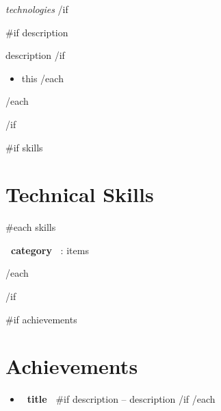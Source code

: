 \documentclass[10pt,a4paper]{article}
\begin{document}
\textit{ {{technologies}} }
{{/if}}


{{#if description}}
\vspace{1pt}

{{description}}
{{/if}}


\begin{itemize}

{{#each bullets}}
    \item {{this}}
{{/each}}

\end{itemize}

\vspace{6pt}

{{/each}}

{{/if}}



{{#if skills}}

\section{Technical Skills}

{{#each skills}}

\textbf{ {{~category~}} }: {{items}}

{{/each}}

{{/if}}



{{#if achievements}}

\section{Achievements}

\begin{itemize}

{{#each achievements}}
    \item
    \textbf{ {{~title~}} }
    {{#if description}}
    -- {{description}}
    {{/if}}
{{/each}}

\end{itemize}
\end{document}
